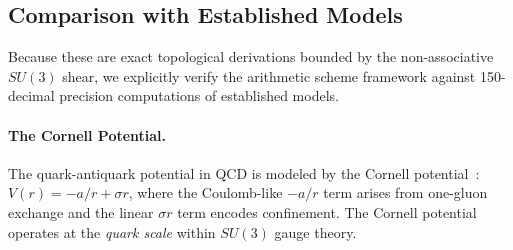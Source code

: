 \begin{table}[ht]
\centering
\renewcommand{\arraystretch}{1.3}
\caption{Cross-field embeddings of the optimal Bode lattice primes into the SU(3) Center triangle. Every Bode prime lands on a structurally significant position (primitive root or golden orbit) in at least two of the three gauge fields. The residue $499 \equiv 137 \pmod{181}$ is particularly striking: the inverse fine structure constant $\alpha^{-1} \approx 137$ emerges naturally on the $\bar\varphi$-orbit of the weak-force field.}
\label{tab:crossfield}
\end{table}

\subsection{Comparison with Established Models}
Because these are exact topological derivations bounded by the non-associative $SU(3)$ shear, we explicitly verify the arithmetic scheme framework against 150-decimal precision computations of established models.

\paragraph{The Cornell Potential.}
The quark-antiquark potential in QCD is modeled by the Cornell potential~\cite{eichten1980}: $V(r) = -a/r + \sigma r$, where the Coulomb-like $-a/r$ term arises from one-gluon exchange and the linear $\sigma r$ term encodes confinement. The Cornell potential operates at the \emph{quark scale} within $SU(3)$ gauge theory.

